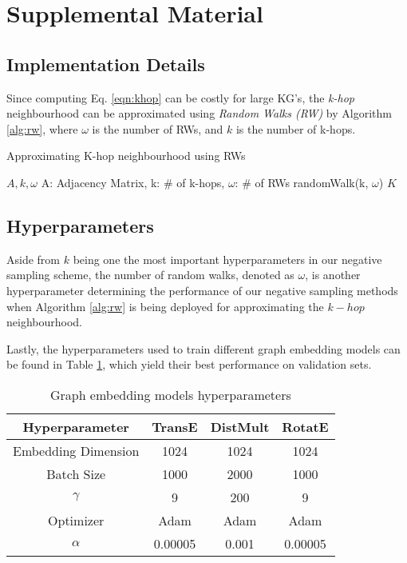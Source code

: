 \section{Supplemental Material}
\label{sec:supplemental}

\subsection{Implementation Details}

Since computing Eq. \ref{eqn:khop} can be costly for large KG's, the \emph{k-hop} neighbourhood can be approximated using \emph{Random Walks (RW)} \cite{perozzi2014deepwalk} by Algorithm \ref{alg:rw}, where $\omega$ is the number of RWs, and $k$ is the number of k-hops.

\begin{algorithm}[h]
    \caption{Approximating K-hop neighbourhood using RWs}
    \begin{algorithmic}
     $A, k, \omega$
    \COMMENT A: Adjacency Matrix, k: \# of k-hops, $\omega$: \# of RWs
     randomWalk(k, $\omega$)
    \ENDFOR
     $K$
    \end{algorithmic}
\label{alg:rw}
\end{algorithm}

\subsection{Hyperparameters}

Aside from $k$ being one the most important hyperparameters in our negative sampling scheme, the number of random walks, denoted as $\omega$, is another hyperparameter determining the performance of our negative sampling methods when Algorithm \ref{alg:rw} is being deployed for approximating the $k-hop$ neighbourhood.

Lastly, the hyperparameters used to train different graph embedding models can be found in Table \ref{tab:param}, which yield their best performance on validation sets.

\begin{table}[h]
\centering
\begin{tabular}{cccc}
\hline
Hyperparameter          &    TransE & DistMult & RotatE \\ \hline
Embedding Dimension     &      1024    &  1024  & 1024   \\ 
Batch Size              &      1000     &  2000 &  1000  \\ 
$\gamma$                &      9        &     200     &  9  \\  
Optimizer               &      Adam    &  Adam      & Adam   \\ 
$\alpha$                &      0.00005 &   0.001    & 0.00005  \\  
\hline
\end{tabular}
\caption{Graph embedding models hyperparameters}
\label{tab:param}
\end{table}

